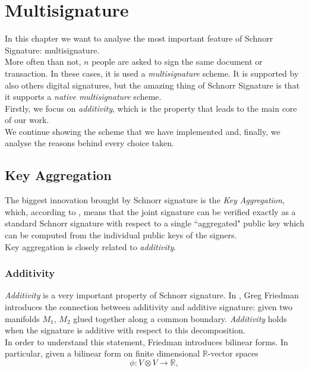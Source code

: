 \chapter{Multisignature}
\label{capitolo4}
In this chapter we want to analyse the most important feature of Schnorr Signature: multisignature.\\
More often than not, $n$ people are asked to sign the same document or transaction. In these cases, it is used a \textit{multisignature} scheme. It is supported by also others digital signatures, but the amazing thing of Schnorr Signature is that it supports a \textit{native multisignature} scheme.\\
Firstly, we focus on \textit{additivity}, which is the property that leads to the main core of our work.\\
We continue showing the scheme that we have implemented and, finally, we analyse the reasons behind every choice taken.\\

\section{Key Aggregation}
The biggest innovation brought by Schnorr signature is the \textit{Key Aggregation}, which, according to \cite{MuSig}, means that the joint signature can be verified exactly as a standard Schnorr signature with respect to a single ``aggregated" public key which can be computed from the individual public keys of the signers.\\
Key aggregation is closely related to \textit{additivity}.
\subsection{Additivity}
\textit{Additivity} is a very important property of Schnorr signature.
In \cite{NovAdd}, Greg Friedman introduces the connection between additivity and additive signature: given two manifolds $M_{1}$, $M_{2}$ glued together along a common boundary. \textit{Additivity} holds when the signature is additive with respect to this decomposition.\\
In order to understand this statement, Friedman introduces bilinear forms. In particular, given a bilinear form on finite dimensional $\mathbb{R}$-vector spaces
\begin{equation*}
\phi:V \otimes V \to \mathbb{R},
\end{equation*}

